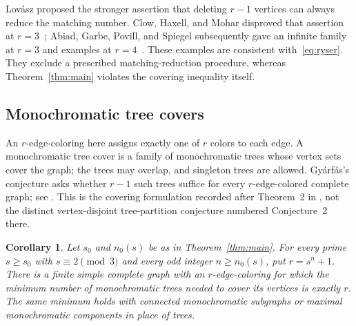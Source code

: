 \documentclass[11pt]{article}
\newtheorem{corollary}[theorem]{Corollary}
\theoremstyle{remark}
\begin{document}
Lov\'asz proposed the stronger assertion that deleting $r-1$ vertices
can always reduce the matching number. Clow, Haxell, and Mohar
disproved that assertion at $r=3$~\cite{CHM2025}; Abiad, Garbe, Povill,
and Spiegel subsequently gave an infinite family at $r=3$ and
examples at $r=4$~\cite{AbiadGarbePovillSpiegel2025}. These examples
are consistent with~\eqref{eq:ryser}. They exclude a prescribed
matching-reduction procedure, whereas Theorem~\ref{thm:main}
violates the covering inequality itself.

\subsection*{Monochromatic tree covers}

An $r$-edge-coloring here assigns exactly one of $r$ colors to each edge.
A monochromatic tree cover is a family of monochromatic trees whose vertex
sets cover the graph; the trees may overlap, and singleton trees are allowed.
Gy\'arf\'as's conjecture asks whether $r-1$ such trees suffice for every
$r$-edge-colored complete graph; see \cite[Conjecture~1]{Milicevic2017}.
This is the covering formulation recorded after Theorem~2 in
\cite[Section~3]{ErdosGyarfasPyber1991}, not the distinct vertex-disjoint
tree-partition conjecture numbered Conjecture~2 there.

\begin{corollary}\label{cor:tree-cover}
Let $s_0$ and $n_0(s)$ be as in Theorem~\ref{thm:main}. For every prime
$s\ge s_0$ with $s\equiv2\pmod3$ and every odd integer $n\ge n_0(s)$,
put $r=s^n+1$. There is a finite simple complete graph with an
$r$-edge-coloring for which the minimum number of monochromatic trees
needed to cover its vertices is exactly $r$. The same minimum holds with
connected monochromatic subgraphs or maximal monochromatic components in
place of trees.
\end{corollary}
\end{document}
